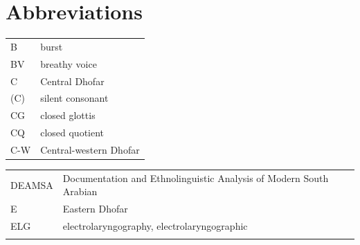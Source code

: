 \documentclass[output=paper]{langscibook}
\begin{document}
\section*{Abbreviations}
\begin{tabularx}{.5\textwidth}{@{}lQ}
B & burst\\
BV & breathy voice\\
C & Central Dhofar\\
(C) & silent consonant \\
CG & closed glottis\\
CQ & closed quotient\\
C-W & Central-western Dhofar\\
\end{tabularx}%
\begin{tabularx}{.5\textwidth}{lQ@{}}
DEAMSA & Documentation and Ethnolinguistic Analysis of Modern South Arabian\\
E & Eastern Dhofar\\
ELG & electrolaryngography, electrolaryngographic\\
\\
\end{tabularx}%
\end{document}
